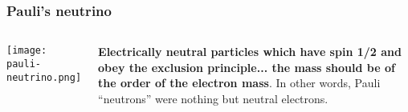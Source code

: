 \begin{frame}
\frametitle{Pauli's neutrino}
\begin{columns}
\texttt{[image: pauli-neutrino.png]}
 
\begin{block}{}
{\bf Electrically neutral particles which have spin 1/2 and obey the exclusion principle... the mass should be of the order of the electron mass}. In other words, Pauli ``neutrons''  were nothing but neutral electrons. 
\end{block}
\end{columns}
\end{frame}
